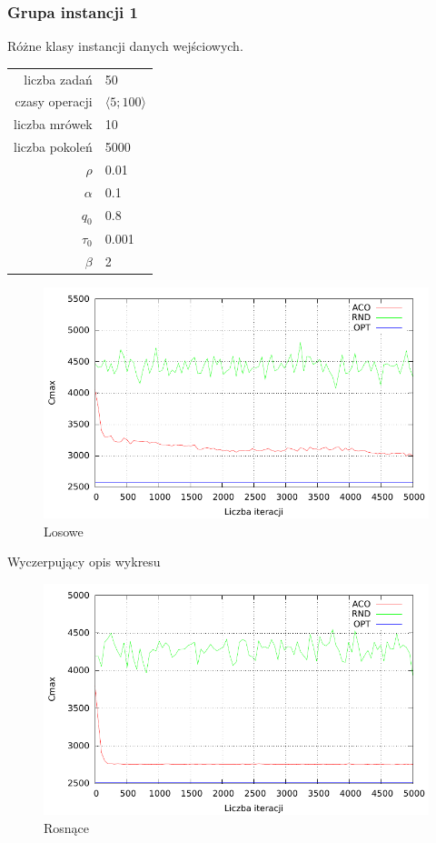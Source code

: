 \documentclass[10pt,a4paper]{article}
\begin{document}
\newpage
\subsubsection{Grupa instancji 1}
Różne klasy instancji danych wejściowych.

\begin{center}
\begin{tabular}{|r|l|}
  \hline
  liczba zadań & 50 \\
  czasy operacji & $ \langle 5;100 \rangle $  \\
  liczba mrówek & 10 \\
  liczba pokoleń & 5000 \\
  $ \rho $ & 0.01 \\
  $ \alpha $ & 0.1 \\
  $ q_0 $ & 0.8 \\
  $ \tau_0 $ & 0.001 \\
  $ \beta $ & 2 \\
  \hline
\end{tabular}
\end{center}

\begin{figure}[h]
    \centering
    \includegraphics{./figures/inst01_rnd_smooth.pdf}
    \caption{Losowe}
\end{figure}

Wyczerpujący opis wykresu


\newpage
\begin{figure}[h]
    \centering
    \includegraphics{./figures/inst02_asc_smooth.pdf}
    \caption{Rosnące}
\end{figure}
\end{document}
